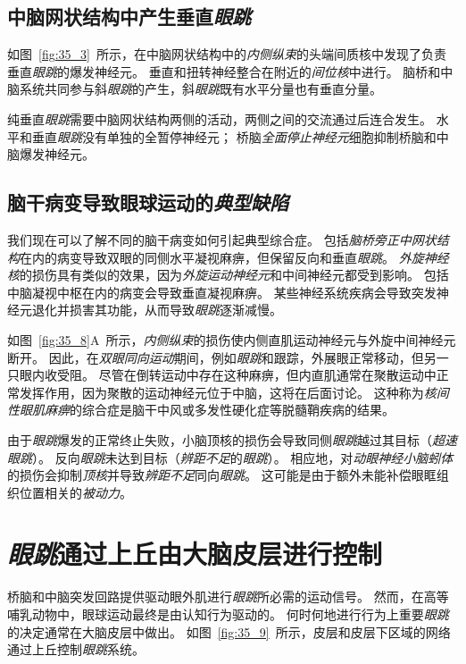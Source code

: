 \subsection{中脑网状结构中产生垂直\textit{眼跳}}

如图~\ref{fig:35_3}~所示，在中脑网状结构中的\textit{内侧纵束}的头端间质核中发现了负责垂直\textit{眼跳}的爆发神经元。
垂直和扭转神经整合在附近的\textit{间位核}中进行。
脑桥和中脑系统共同参与斜\textit{眼跳}的产生，斜\textit{眼跳}既有水平分量也有垂直分量。


纯垂直\textit{眼跳}需要中脑网状结构两侧的活动，两侧之间的交流通过后连合发生。
水平和垂直\textit{眼跳}没有单独的全暂停神经元；
桥脑\textit{全面停止神经元}细胞抑制桥脑和中脑爆发神经元。



\subsection{脑干病变导致眼球运动的\textit{典型缺陷}}

我们现在可以了解不同的脑干病变如何引起典型综合症。
包括\textit{脑桥旁正中网状结构}在内的病变导致双眼的同侧水平凝视麻痹，但保留反向和垂直\textit{眼跳}。
\textit{外旋神经核}的损伤具有类似的效果，因为\textit{外旋运动神经元}和中间神经元都受到影响。
包括中脑凝视中枢在内的病变会导致垂直凝视麻痹。
某些神经系统疾病会导致突发神经元退化并损害其功能，从而导致\textit{眼跳}逐渐减慢。


如图~\ref{fig:35_8}A~所示，\textit{内侧纵束}的损伤使内侧直肌运动神经元与外旋中间神经元断开。
因此，在\textit{双眼同向运动}期间，例如\textit{眼跳}和跟踪，外展眼正常移动，但另一只眼内收受阻。
尽管在倒转运动中存在这种麻痹，但内直肌通常在聚散运动中正常发挥作用，因为聚散的运动神经元位于中脑，这将在后面讨论。
这种称为\textit{核间性眼肌麻痹}的综合症是脑干中风或多发性硬化症等脱髓鞘疾病的结果。


由于\textit{眼跳}爆发的正常终止失败，小脑顶核的损伤会导致同侧\textit{眼跳}越过其目标（\textit{超速眼跳}）。
反向\textit{眼跳}未达到目标（\textit{辨距不足}的\textit{眼跳}）。
相应地，对\textit{动眼神经小脑蚓体}的损伤会抑制\textit{顶核}并导致\textit{辨距不足}同向\textit{眼跳}。
这可能是由于额外未能补偿眼眶组织位置相关的\textit{被动力}。



\section{\textit{眼跳}通过上丘由大脑皮层进行控制}

桥脑和中脑突发回路提供驱动眼外肌进行\textit{眼跳}所必需的运动信号。
然而，在高等哺乳动物中，眼球运动最终是由认知行为驱动的。
何时何地进行行为上重要\textit{眼跳}的决定通常在大脑皮层中做出。
如图~\ref{fig:35_9}~所示，皮层和皮层下区域的网络通过上丘控制\textit{眼跳}系统。


